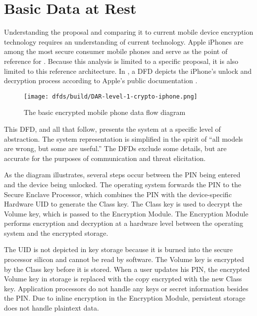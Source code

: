 \modelend


\section{Basic Data at Rest}
\label{sec-basic-dar}

Understanding the \ldawmsr proposal and comparing it to current mobile device encryption technology requires an
understanding of current technology. Apple iPhones are among the most secure consumer mobile phones and serve as the
point of reference for \ldawmsR. Because this analysis is limited to a specific proposal, it is also limited to this
reference architecture. In , a \ac{DFD} depicts the iPhone's unlock and decryption process
according to Apple's public documentation \cite{apple_2020}.

\begin{figure}[h]
    \centering\CaptionFontSize
    \texttt{[image: dfds/build/DAR-level-1-crypto-iphone.png]}
    \caption{The basic encrypted mobile phone data flow diagram}
    \label{fig-dfd-iphone}
\end{figure}

This \ac{DFD}, and all that follow, presents the system at a specific level of abstraction. The system representation is
simplified in the spirit of ``all models are wrong, but some are useful.'' The \acp{DFD} exclude some details, but are
accurate for the purposes of communication and threat elicitation.

As the diagram illustrates, several steps occur between the \ac{PIN} being entered and the device being unlocked. The
operating system forwards the \ac{PIN} to the Secure Enclave Processor, which combines the \ac{PIN} with the
device-specific Hardware \ac{UID} to generate the Class key. The Class key is used to decrypt the Volume key, which is
passed to the Encryption Module. The Encryption Module performs encryption and decryption at a hardware level between
the operating system and the encrypted storage.

The \ac{UID} is not depicted in key storage because it is burned into the secure processor silicon and cannot be read by
software. The Volume key is encrypted by the Class key before it is stored. When a user updates his \ac{PIN}, the
encrypted Volume key in storage is replaced with the copy encrypted with the new Class key. Application processors do
not handle any keys or secret information besides the \ac{PIN}. Due to inline encryption in the Encryption Module,
persistent storage does not handle \ac{plaintext} data.


